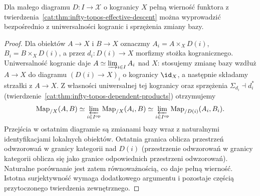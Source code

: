 \begin{stwierdzenie}\label{cat:prop:infty-topos-descent-full-faithful}
Dla małego diagramu $D:I\to\mathcal X$ o kogranicy $X$ pełną wierność funktora z twierdzenia~\ref{cat:thm:infty-topos-effective-descent} można wyprowadzić bezpośrednio z uniwersalności kogranic i sprzężenia zmiany bazy.
\end{stwierdzenie}
\begin{proof}
Dla obiektów $A\to X$ i $B\to X$ oznaczmy $A_i=A\times_X D(i)$, $B_i=B\times_X D(i)$, a przez $d_i:D(i)\to X$ morfizmy stożka kogranicznego. Uniwersalność kogranic daje $A\simeq\varinjlim_{i\in I} A_i$ nad $X$: stosujemy zmianę bazy wzdłuż $A\to X$ do diagramu $(D(i)\to X)_i$ o kogranicy $\id_X$, a następnie składamy strzałki z $A\to X$. Z własności uniwersalnej tej kogranicy oraz sprzężenia $\Sigma_{d_i}\dashv d_i^*$ (twierdzenie~\ref{cat:thm:infty-topos-dependent-products}) otrzymujemy
\[
 \operatorname{Map}_{/X}(A,B)
 \simeq\varprojlim_{i\in I^{\mathrm{op}}}\operatorname{Map}_{/X}(A_i,B)
 \simeq\varprojlim_{i\in I^{\mathrm{op}}}
                 \operatorname{Map}_{/D(i)}(A_i,B_i).
\]
Przejścia w ostatnim diagramie są zmianami bazy wraz z naturalnymi identyfikacjami lokalnych obiektów. Ostatnia granica oblicza przestrzeń odwzorowań w granicy kategorii nad $D(i)$ (przestrzenie odwzorowań w granicy kategorii oblicza się jako granice odpowiednich przestrzeni odwzorowań). Naturalne porównanie jest zatem równoważnością, co daje pełną wierność. Istotna surjektywność wymaga dodatkowego argumentu i pozostaje częścią przytoczonego twierdzenia zewnętrznego.
\end{proof}

